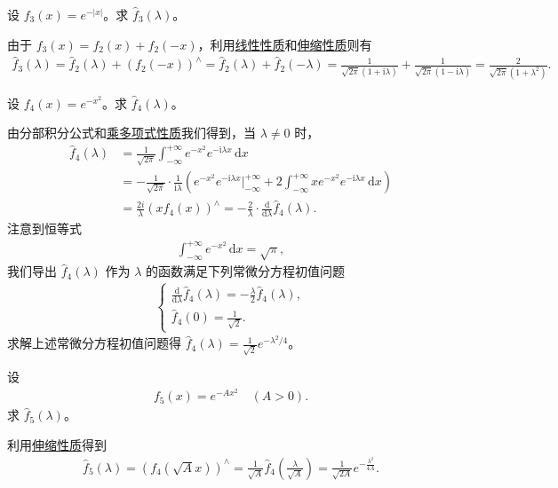\documentclass[../../main.tex]{subfiles}%
\begin{document}
\begin{example}
设 $f_3(x)=e^{-|x|}$。求 $\hat{f}_3(\lambda)$。
\end{example}
\begin{solution}
由于 $f_3(x)=f_2(x)+f_2(-x)$，利用\hyperref[proposition:Fourier 变换的基本性质1-1]{线性性质}和\hyperref[proposition:Fourier 变换的基本性质1-5]{伸缩性质}则有
\begin{align*}
\hat{f}_3(\lambda)=\hat{f}_2(\lambda)+(f_2(-x))^\wedge 
=\hat{f}_2(\lambda)+\hat{f}_2(-\lambda) 
=\frac{1}{\sqrt{2\pi}(1+\mathrm{i}\lambda )}+\frac{1}{\sqrt{2\pi}(1-\mathrm{i}\lambda )} 
=\frac{2}{\sqrt{2\pi}(1+\lambda^2)}.
\end{align*}
\end{solution}

\begin{example}
设 $f_4(x)=e^{-x^2}$。求 $\hat{f}_4(\lambda)$。
\end{example}
\begin{solution}
由分部积分公式和\hyperref[proposition:Fourier 变换的基本性质1-3]{乘多项式性质}我们得到，当 $\lambda\neq 0$ 时，
\begin{align*}
\hat{f}_4(\lambda)&=\frac{1}{\sqrt{2\pi}}\int_{-\infty}^{+\infty}e^{-x^2}e^{-\mathrm{i}\lambda  x}\,\mathrm{d}x \\
&=-\frac{1}{\sqrt{2\pi}}\cdot\frac{1}{\mathrm{i}\lambda }\left(e^{-x^2}e^{-\mathrm{i}\lambda  x}\Big|_{-\infty}^{+\infty}+2\int_{-\infty}^{+\infty}xe^{-x^2}e^{-\mathrm{i}\lambda  x}\,\mathrm{d}x\right) \\
&=\frac{2i}{\lambda}(xf_4(x))^\wedge=-\frac{2}{\lambda}\cdot\frac{\mathrm{d}}{\mathrm{d}\lambda}\hat{f}_4(\lambda).
\end{align*}
注意到恒等式
\begin{align*}
\int_{-\infty}^{+\infty}e^{-x^2}\,\mathrm{d}x=\sqrt{\pi},
\end{align*}
我们导出 $\hat{f}_4(\lambda)$ 作为 $\lambda$ 的函数满足下列常微分方程初值问题
\begin{align*}
\begin{cases}
\frac{\mathrm{d}}{\mathrm{d}\lambda}\hat{f}_4(\lambda)=-\frac{\lambda}{2}\hat{f}_4(\lambda),\\
\hat{f}_4(0)=\frac{1}{\sqrt{2}}.
\end{cases}
\end{align*}
求解上述常微分方程初值问题得 $\hat{f}_4(\lambda)=\frac{1}{\sqrt{2}}e^{-\lambda^2/4}$。
\end{solution}

\begin{example}
设
\begin{align*}
f_5(x)=e^{-Ax^2}\quad (A>0).
\end{align*}
求 $\hat{f}_5(\lambda)$。
\end{example}
\begin{solution}
利用\hyperref[proposition:Fourier 变换的基本性质1-5]{伸缩性质}得到
\begin{align*}
\hat{f}_5(\lambda)=(f_4(\sqrt{A}x))^\wedge=\frac{1}{\sqrt{A}}\hat{f}_4\left(\frac{\lambda}{\sqrt{A}}\right)
=\frac{1}{\sqrt{2A}}e^{-\frac{\lambda^2}{4A}}.
\end{align*}
\end{solution}
\end{document}
